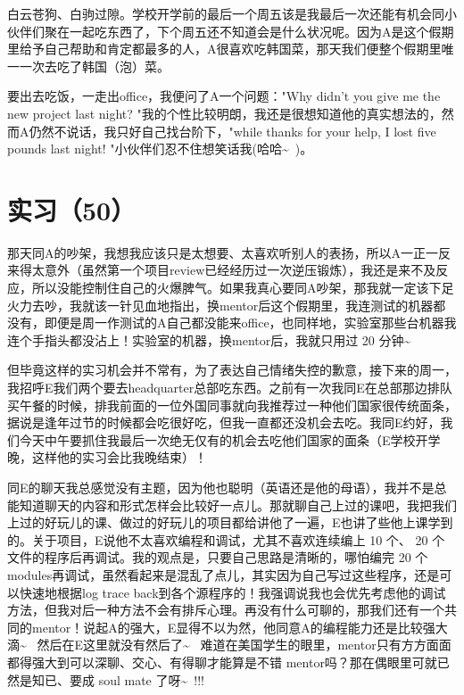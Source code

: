 \documentclass[12pt]{book}
\begin{document}
白云苍狗、白驹过隙。学校开学前的最后一个周五该是我最后一次还能有机会同小伙伴们聚在一起吃东西了，下个周五还不知道会是什么状况呢。因为A是这个假期里给予自己帮助和肯定都最多的人，A很喜欢吃韩国菜，那天我们便整个假期里唯一一次去吃了韩国（泡）菜。

要出去吃饭，一走出office，我便问了A一个问题："Why didn't you give me the new project last night? "我的个性比较明朗，我还是很想知道他的真实想法的，然而A仍然不说话，我只好自己找台阶下，"while thanks for your help, I lost five pounds last night! "小伙伴们忍不住想笑话我(哈哈\textasciitilde{}~)。


\section{实习（50）}
\label{sec-5-53}

那天同A的吵架，我想我应该只是太想要、太喜欢听别人的表扬，所以A一正一反来得太意外（虽然第一个项目review已经经历过一次逆压锻炼），我还是来不及反应，所以没能控制住自己的火爆脾气。如果我真心要同A吵架，那我就一定该下足火力去吵，我就该一针见血地指出，换mentor后这个假期里，我连测试的机器都没有，即便是周一作测试的A自己都没能来office，也同样地，实验室那些台机器我连个手指头都没沾上！实验室的机器，换mentor后，我就只用过 20 分钟\textasciitilde{}~

但毕竟这样的实习机会并不常有，为了表达自己情绪失控的歉意，接下来的周一，我招呼E我们两个要去headquarter总部吃东西。之前有一次我同E在总部那边排队买午餐的时候，排我前面的一位外国同事就向我推荐过一种他们国家很传统面条，据说是逢年过节的时候都会吃很好吃，但我一直都还没机会去吃。我同E约好，我们今天中午要抓住我最后一次绝无仅有的机会去吃他们国家的面条（E学校开学晚，这样他的实习会比我晚结束）！　

同E的聊天我总感觉没有主题，因为他也聪明（英语还是他的母语），我并不是总能知道聊天的内容和形式怎样会比较好一点儿。那就聊自己上过的课吧，我把我们上过的好玩儿的课、做过的好玩儿的项目都给讲他了一遍，E也讲了些他上课学到的。关于项目，E说他不太喜欢编程和调试，尤其不喜欢连续编上 10 个、 20 个文件的程序后再调试。我的观点是，只要自己思路是清晰的，哪怕编完 20 个modules再调试，虽然看起来是混乱了点儿，其实因为自己写过这些程序，还是可以快速地根据log trace back到各个源程序的！我强调说我也会优先考虑他的调试方法，但我对后一种方法不会有排斥心理。再没有什么可聊的，那我们还有一个共同的mentor！说起A的强大，E显得不以为然，他同意A的编程能力还是比较强大滴\textasciitilde{}~  然后在E这里就没有然后了\textasciitilde{}~ 难道在美国学生的眼里，mentor只有方方面面都得强大到可以深聊、交心、有得聊才能算是不错 mentor吗？那在偶眼里可就已然是知已、要成 soul mate 了呀\textasciitilde{}~!!!
\end{document}
